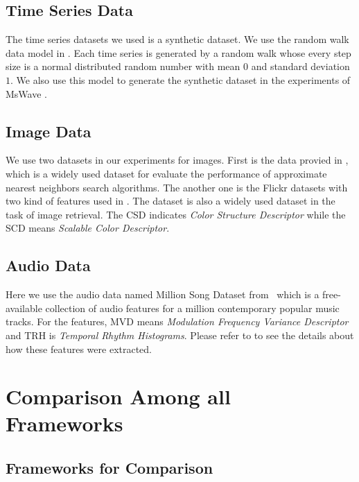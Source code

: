 \subsection{Time Series Data} %
\label{ssb:time}
The time series datasets we used is a synthetic dataset.  We use the random walk data model in \cite{time}.  Each time series is generated by a random walk whose every step size is a normal distributed random number with mean $0$ and standard deviation $1$.  We also use this model to generate the synthetic dataset in the experiments of MsWave \cite{MsWave}.

\subsection{Image Data} %
\label{ss:Image}
We use two datasets in our experiments for images.  First is the data provied in \cite{ANN}, which is a widely used dataset for evaluate the performance of approximate nearest neighbors search algorithms.  The another one is the Flickr datasets with two kind of features used in \cite{Flickr}.  The dataset is also a widely used dataset in the task of image retrieval.  The CSD indicates \emph{Color Structure Descriptor} while the SCD means \emph{Scalable Color Descriptor}.

\subsection{Audio Data} %
\label{sub:audio_data}
Here we use the audio data named Million Song Dataset from~\cite{Bertin-Mahieux2011} which is a free-available collection of audio features for a million contemporary popular music tracks. For the features, MVD means \emph{Modulation Frequency Variance Descriptor} and TRH is \emph{Temporal Rhythm Histograms}.  Please refer to \cite{LID_05ismir,RAU_03jnmr,RAU_01ecdl} to see the details about how these features were extracted.


\section{Comparison Among all Frameworks} %
\label{s:comparison_among_all_frameworks}

\subsection{Frameworks for Comparison} %
\label{ss:frameworks_for_comparison}

